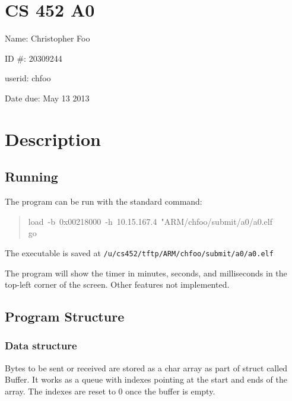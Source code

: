 \documentclass[letterpaper]{article}
\newenvironment{DUfieldlist}%
    {\quote\description}
    {\enddescription\endquote}
\begin{document}
\section{CS 452 A0%
  \label{cs-452-a0}%
}
%
\begin{DUfieldlist}
\item[{Name:}]
Christopher Foo

\item[{ID \#:}]
20309244

\item[{userid:}]
chfoo

\item[{Date due:}]
May 13 2013

\end{DUfieldlist}

\newpage


\section{Description%
  \label{description}%
}


\subsection{Running%
  \label{running}%
}

The program can be run with the standard command:
%
\begin{quote}{\ttfamily \raggedright \noindent
load~-b~0x00218000~-h~10.15.167.4~"ARM/chfoo/submit/a0/a0.elf\\
go
}
\end{quote}

The executable is saved at \texttt{/u/cs452/tftp/ARM/chfoo/submit/a0/a0.elf}

The program will show the timer in minutes, seconds, and milliseconds in the top-left corner of the screen. Other features not implemented.


\subsection{Program Structure%
  \label{program-structure}%
}


\subsubsection{Data structure%
  \label{data-structure}%
}

Bytes to be sent or received are stored as a char array as part of struct called Buffer. It works as a queue with indexes pointing at the start and ends of the array. The indexes are reset to 0 once the buffer is empty.
\end{document}
